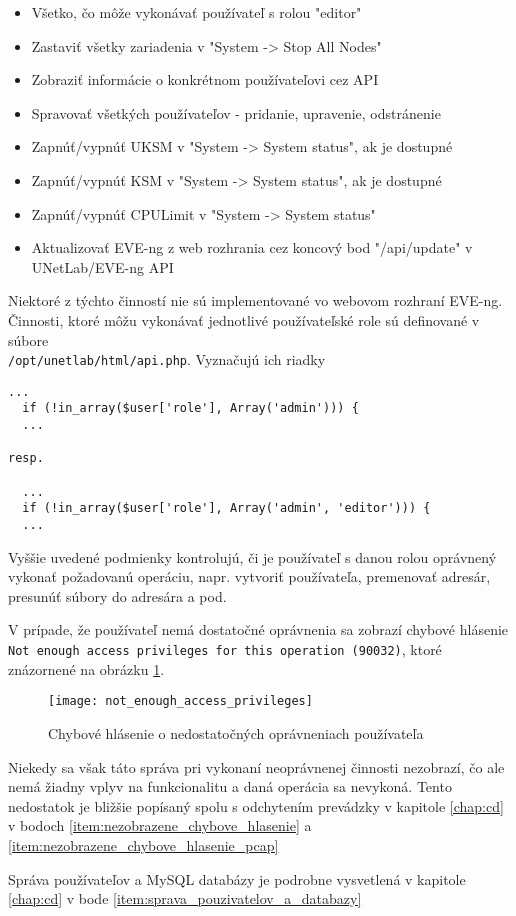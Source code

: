 \begin{itemize}[noitemsep]
    \item Všetko, čo môže vykonávať používateľ s rolou "editor"
    \item Zastaviť všetky zariadenia v "System -> Stop All Nodes"
    \item Zobraziť informácie o konkrétnom používateľovi cez API
    \item Spravovať všetkých používateľov - pridanie, upravenie, odstránenie
    \item Zapnúť/vypnúť UKSM v "System -> System status", ak je dostupné
    \item Zapnúť/vypnúť KSM v "System -> System status", ak je dostupné
    \item Zapnúť/vypnúť CPULimit v "System -> System status"
    \item Aktualizovať EVE-ng z web rozhrania cez koncový bod "/api/update" v UNetLab/EVE-ng API
\end{itemize}

Niektoré z týchto činností nie sú implementované vo webovom rozhraní EVE-ng. Činnosti, ktoré môžu vykonávať jednotlivé používateľské role sú definované v súbore \\
\texttt{/opt/unetlab/html/api.php}. Vyznačujú ich riadky

\begin{Verbatim}[samepage=true]
  ...
  if (!in_array($user['role'], Array('admin'))) {
  ...

resp.

  ...
  if (!in_array($user['role'], Array('admin', 'editor'))) {
  ...
\end{Verbatim}

Vyššie uvedené podmienky kontrolujú, či je používateľ s danou rolou oprávnený vykonať požadovanú operáciu, napr. vytvoriť používateľa, premenovať adresár, presunúť súbory do adresára a pod.

V prípade, že používateľ nemá dostatočné oprávnenia sa zobrazí chybové hlásenie \texttt{Not enough access privileges for this operation (90032)}, ktoré znázornené na obrázku \ref{obr:not_enough_access_privileges}.

\begin{figure}
    \centering
    \texttt{[image: not\_enough\_access\_privileges]}
    \caption{Chybové hlásenie o nedostatočných oprávneniach používateľa}
    \label{obr:not_enough_access_privileges}
\end{figure}

Niekedy sa však táto správa pri vykonaní neoprávnenej činnosti nezobrazí, čo ale nemá žiadny vplyv na funkcionalitu a daná operácia sa nevykoná. Tento nedostatok je bližšie popísaný spolu s odchytením prevádzky v kapitole \ref{chap:cd} v bodoch \ref{item:nezobrazene_chybove_hlasenie} a \ref{item:nezobrazene_chybove_hlasenie_pcap}

Správa používateľov a MySQL databázy je podrobne vysvetlená v kapitole \ref{chap:cd} v bode \ref{item:sprava_pouzivatelov_a_databazy}
